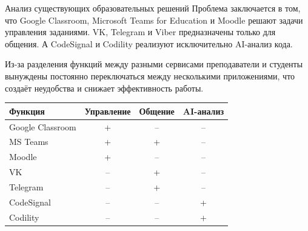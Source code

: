 \documentclass[aspectratio=169]{beamer}
\begin{document}
\begin{frame}{Анализ существующих образовательных решений}
\small
\justifying
Проблема заключается в том, что Google Classroom, Microsoft Teams for Education и Moodle решают задачи управления заданиями. VK, Telegram и Viber предназначены только для общения. А CodeSignal и Codility реализуют исключительно AI-анализ кода.

\vspace{0.8em}

Из-за разделения функций между разными сервисами преподаватели и студенты вынуждены постоянно переключаться между несколькими приложениями, что создаёт неудобства и снижает эффективность работы.

\vspace{1em}

\centering
\begin{tabular}{lccc}
\hline
\textbf{Функция} & Управление & Общение & AI-анализ \\
\hline
Google Classroom & + & -- & -- \\
MS Teams         & + & +  & -- \\
Moodle           & + & -- & -- \\
VK               & -- & +  & -- \\
Telegram         & -- & +  & -- \\
CodeSignal       & -- & -- & +  \\
Codility         & -- & -- & +  \\
\hline
\end{tabular}
\end{frame}
\end{document}
